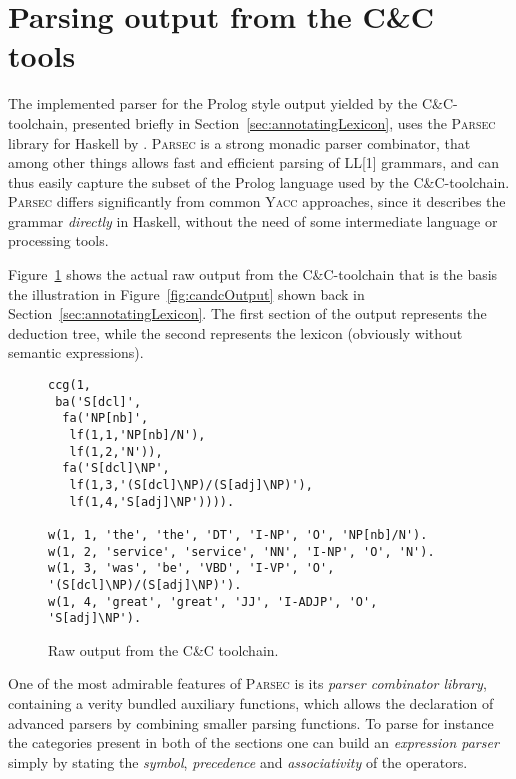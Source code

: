 \section{Parsing output from the C\&C tools}
The implemented parser for the Prolog style output yielded by the C\&C-toolchain, presented briefly in Section~\ref{sec:annotatingLexicon}, uses the \textsc{Parsec} library for Haskell by \citeauthor{parsec} . \textsc{Parsec} is a strong monadic parser combinator, that among other things allows fast and efficient parsing of LL[1] grammars, and can thus easily capture the subset of the Prolog language used by the C\&C-toolchain. \textsc{Parsec} differs significantly from common \textsc{Yacc} approaches, since it describes the grammar \emph{directly} in Haskell, without the need of some intermediate language or processing tools.

Figure~\ref{fig:candcOutputReal} shows the actual raw output from the C\&C-toolchain that is the basis the illustration in Figure~\ref{fig:candcOutput} shown back in Section~\ref{sec:annotatingLexicon}. The first section of the output represents the deduction tree, while the second represents the lexicon (obviously without semantic expressions).

\begin{figure}[ht]
\center
\begin{cframed}{.8\textwidth}
	\scriptsize
	\begin{verbatim}
ccg(1,
 ba('S[dcl]',
  fa('NP[nb]',
   lf(1,1,'NP[nb]/N'),
   lf(1,2,'N')),
  fa('S[dcl]\NP',
   lf(1,3,'(S[dcl]\NP)/(S[adj]\NP)'),
   lf(1,4,'S[adj]\NP')))).

w(1, 1, 'the', 'the', 'DT', 'I-NP', 'O', 'NP[nb]/N').
w(1, 2, 'service', 'service', 'NN', 'I-NP', 'O', 'N').
w(1, 3, 'was', 'be', 'VBD', 'I-VP', 'O', '(S[dcl]\NP)/(S[adj]\NP)').
w(1, 4, 'great', 'great', 'JJ', 'I-ADJP', 'O', 'S[adj]\NP').
	\end{verbatim}
\end{cframed}
\vspace{1em}
	\caption{Raw output from the C\&C toolchain.}
	\label{fig:candcOutputReal}
\end{figure}

One of the most admirable features of \textsc{Parsec} is its \emph{parser combinator library}, containing a verity bundled auxiliary functions, which allows the declaration of advanced parsers by combining smaller parsing functions. To parse for instance the categories present in both of the sections one can build an \emph{expression parser} simply by stating the \emph{symbol}, \emph{precedence} and \emph{associativity} of the operators.


